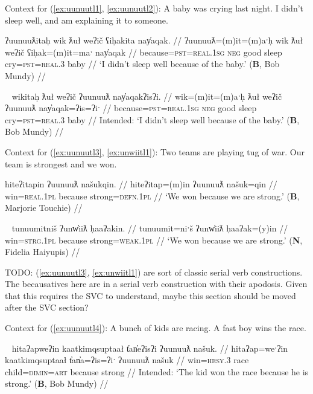 Context for (\ref{ex:uunuutl1}, \ref{ex:uunuutl2}): A baby was crying last night. I didn't sleep well, and am explaining it to someone.

\ex \label{ex:uunuutl1}
\begingl
\glpreamble ʔuunuuƛitaḥ wik ƛuł weʔič ʕiḥakita nay̓aqak. //
\gla ʔuunuuƛ=(m)it=(m)aˑḥ wik ƛuł weʔič ʕiḥak=(m)it=maˑ nay̓aqak //
\glb because=\textsc{pst}=\textsc{real.1sg} \textsc{neg} good sleep cry=\textsc{pst}=\textsc{real.3} baby //
\glft `I didn't sleep well because of the baby.' (\textbf{B}, Bob Mundy) //
\endgl
\xe

\ex~ \label{ex:uunuutl2}
\begingl
\glpreamble *wikitaḥ ƛuł weʔič ʔuunuuƛ nay̓aqakʔisʔi. //
\gla wik=(m)it=(m)aˑḥ ƛuł weʔič ʔuunuuƛ nay̓aqak=ʔis=ʔiˑ //
\glb because=\textsc{pst}=\textsc{real.1sg} \textsc{neg} good sleep cry=\textsc{pst}=\textsc{real.3} baby //
\glft Intended: `I didn't sleep well because of the baby.' (\textbf{B}, Bob Mundy) //
\endgl
\xe

Context for (\ref{ex:uunuutl3}, \ref{ex:unwiitl1}): Two teams are playing tug of war. Our team is strongest and we won.

\ex \label{ex:uunuutl3}
\begingl
\glpreamble hiteʔitapin ʔuunuuƛ našukqin. //
\gla hiteʔitap=(m)in ʔuunuuƛ našuk=qin //
\glb win=\textsc{real.1pl} because strong=\textsc{defn.1pl} //
\glft `We won because we are strong.' (\textbf{B}, Marjorie Touchie) //
\endgl
\xe

\ex~ \label{ex:unwiitl1}
\begingl
\glpreamble tunuumitniš ʔunw̓iiƛ ḥaaʔakin. //
\gla tunuumit=niˑš ʔunw̓iiƛ ḥaaʔak=(y)in //
\glb win=\textsc{strg.1pl} because strong=\textsc{weak.1pl} //
\glft `We won because we are strong.' (\textbf{N}, Fidelia Haiyupis) //
\endgl
\xe

TODO: (\ref{ex:uunuutl3}, \ref{ex:unwiitl1}) are sort of classic serial verb constructions. The becausatives here are in a serial verb construction with their apodosis. Given that this requires the SVC to understand, maybe this section should be moved after the SVC section?

\vspace{5pt}

Context for (\ref{ex:uunuutl4}): A bunch of kids are racing. A fast boy wins the race.

\ex~ \label{ex:uunuutl4}
\begingl
\glpreamble *hitaʔapweʔin kaatkimqsuptaał t̓an̓eʔisʔi ʔuunuuƛ našuk. //
\gla hitaʔap=weˑʔin kaatkimqsuptaał t̓an̓a=ʔis=ʔiˑ ʔuunuuƛ našuk //
\glb win=\textsc{hrsy.3} race child=\textsc{dimin}=\textsc{art} because strong //
\glft Intended: `The kid won the race because he is strong.' (\textbf{B}, Bob Mundy) //
\endgl
\xe

